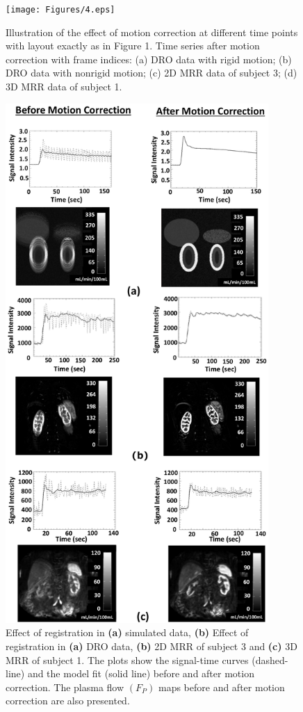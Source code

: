 \documentclass[num-refs]{wiley-article}
\begin{document}
\begin{figure}[tb!]
	\begin{center}
		\texttt{[image: Figures/4.eps]}
		\caption{  Illustration of the effect of motion correction at different time points with layout exactly as in Figure 1. Time series after motion correction with frame indices: (a) DRO data with rigid motion; (b) DRO data with nonrigid motion; (c) 2D MRR data of subject 3; (d) 3D MRR data of subject 1.}
	\end{center}
\end{figure}

\begin{figure}[tb!]
	\begin{center}
		\includegraphics[width=10cm]{Figures/5.eps}
		\caption{  Effect of registration in {\bf (a)} simulated data, {\bf (b)} Effect of registration in {\bf (a)} DRO data, {\bf (b)} 2D MRR of subject 3 and {\bf (c)} 3D MRR of subject 1. The plots show the signal-time curves (dashed-line) and the model fit (solid line) before and after motion correction. The plasma flow $(F_P)$ maps before and after motion correction are also presented.}
	\end{center}
\end{figure}
\end{document}
